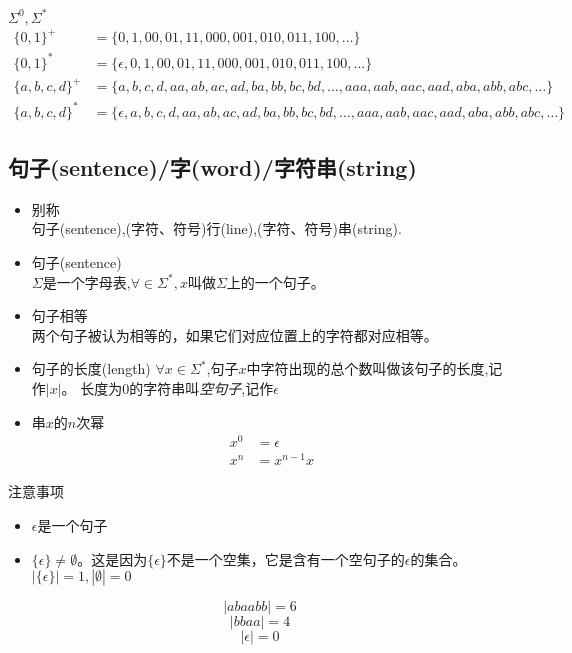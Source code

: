 \begin{example} $\Sigma^0,\Sigma^{\ast}$ 
	\begin{align*}
	\{0,1\}^+ &= \{0,1,00,01,11,000,001,010,011,100,\dots\}\\
	\{0,1\}^{\ast} &= \{\epsilon,0,1,00,01,11,000,001,010,011,100,\dots\}\\
	\{a,b,c,d\}^+ &= \{a,b,c,d,aa,ab,ac,ad,ba,bb,bc,bd,\dots,aaa,aab,aac,aad,aba,abb,abc,\dots\}\\
	\{a,b,c,d\}^{\ast} &= \{\epsilon,a,b,c,d,aa,ab,ac,ad,ba,bb,bc,bd,\dots,aaa,aab,aac,aad,aba,abb,abc,\dots\}
	\end{align*}
\end{example}

\subsection{句子(sentence)/字(word)/字符串(string)}
\begin{itemize}
	\item 别称\\
		句子(sentence),(字符、符号)行(line),(字符、符号)串(string).
	\item 句子(sentence)\\
		$\Sigma$是一个字母表,$\forall \in \Sigma^{\ast},x$叫做$\Sigma$上的一个句子。
	\item 句子相等\\
		两个句子被认为相等的，如果它们对应位置上的字符都对应相等。
	\item 句子的长度(length)
		\subitem{-} $\forall x\in \Sigma^{\ast}$,句子$x$中字符出现的总个数叫做该句子的长度,记作$|x|$。
		\subitem{-} 长度为0的字符串叫\emph{空句子},记作$\epsilon$
	\item 串$x$的$n$次幂
	\begin{align*}
		x^0 &= \epsilon \\
		x^n &= x^{n-1}x
	\end{align*}
\end{itemize}

\begin{note} 注意事项
	\begin{itemize}
		\item $\epsilon$是一个句子
		\item $\{\epsilon\}\ne \emptyset$。这是因为$\{\epsilon\}$不是一个空集，它是含有一个空句子的$\epsilon$的集合。$|\{\epsilon\}|=1,|\emptyset|=0$
	\end{itemize}
\end{note}

\begin{example}
	$$|abaabb|=6$$
	$$|bbaa|=4$$
	$$|\epsilon|=0$$
\end{example}

